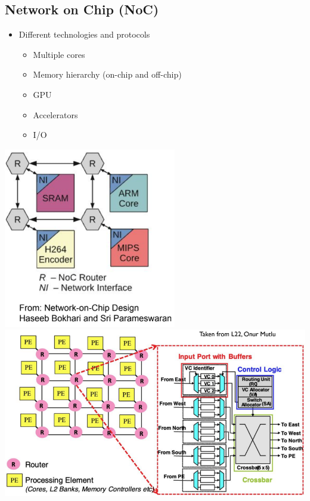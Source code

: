 \documentclass[10pt]{article}
\begin{document}
\subsection*{Network on Chip (NoC)}
\begin{itemize}
    \item Different technologies and protocols
    \begin{itemize}
        \item Multiple cores
        \item Memory hierarchy (on-chip and off-chip)
        \item GPU
        \item Accelerators
        \item I/O
    \end{itemize}
\end{itemize}
\begin{center}
    \includegraphics[scale=0.9]{W10_4.png}\\
    \includegraphics*[scale=0.6]{W10_5.png}
\end{center}
\end{document}
